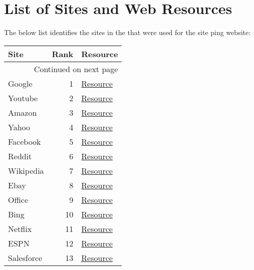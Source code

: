 \chapter{List of Sites and Web Resources}\label{sec:sites_list}

The below list identifies the sites in the \us that were used for the site ping website:

\footnotesize
\begin{longtable}{lrl}
\toprule
Site & Rank & Resource \\
\midrule
\endhead
\midrule
\multicolumn{3}{r}{{Continued on next page}} \\
\midrule
\endfoot

\bottomrule
\endlastfoot
Google        &     1 & \href{http://www.google.com/images/searchbox/desktop\_searchbox\_sprites302\_hr.png}{Resource} \\
Youtube       &     2 & \href{http://s.ytimg.com/yts/img/favicon\_32-vflOogEID.png}{Resource} \\
Amazon        &     3 & \href{http://www.amazon.com/empty.gif}{Resource} \\
Yahoo         &     4 & \href{http://s.yimg.com/os/mit/ape/m/81f43c2/t.gif}{Resource} \\
Facebook      &     5 & \href{http://static.xx.fbcdn.net/images/emoji.php/v9/t91/1.5/16/1f44d\_1f3fc.png}{Resource} \\
Reddit        &     6 & \href{http://www.redditstatic.com/desktop2x/img/renderTimingPixel.png}{Resource} \\
Wikipedia     &     7 & \href{http://www.wikipedia.org/static/apple-touch/wikipedia.png}{Resource} \\
Ebay          &     8 & \href{http://ir.ebaystatic.com/pictures/aw/pics/s\_1x2.gif}{Resource} \\
Office        &     9 & \href{http://a.fp.measure.office.com/apc/trans.gif}{Resource} \\
Bing          &    10 & \href{http://www.bing.com/favicon.ico}{Resource} \\
Netflix       &    11 & \href{http://help.nflxext.com/helpcenter/fc264264a231904b0fce67cd98399e10.svg}{Resource} \\
ESPN          &    12 & \href{http://a.espncdn.com/combiner/i?img=\%2Fi\%2Fespn\%2Fnetworks\_shows\%2F500\%2Fundefeated.png\&w=60\&h=60\&scale=crop\&cquality=80\&location=origin}{Resource} \\
Salesforce    &    13 & \href{http://c1.sfdcstatic.com/etc/clientlibs/sfdc-aem-master/clientlibs\_base/imgs/spacer.gif}{Resource} \\

\end{longtable}
